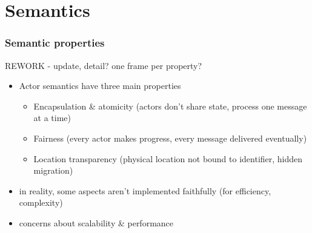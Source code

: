 \section{Semantics}
\begin{frame}
\frametitle{Semantic properties}
REWORK - update, detail? one frame per property?
\begin{itemize}
\item Actor semantics have three main properties
	\begin{itemize}
	\item Encapsulation \& atomicity
	(actors don't share state, process one message at a time)
	\item Fairness
	(every actor makes progress, every message delivered eventually)
	\item Location transparency
	(physical location not bound to identifier, hidden migration)
	\end{itemize}
\item in reality, some aspects aren't implemented faithfully (for efficiency, complexity)
\item concerns about scalability \& performance
\end{itemize}
\end{frame}